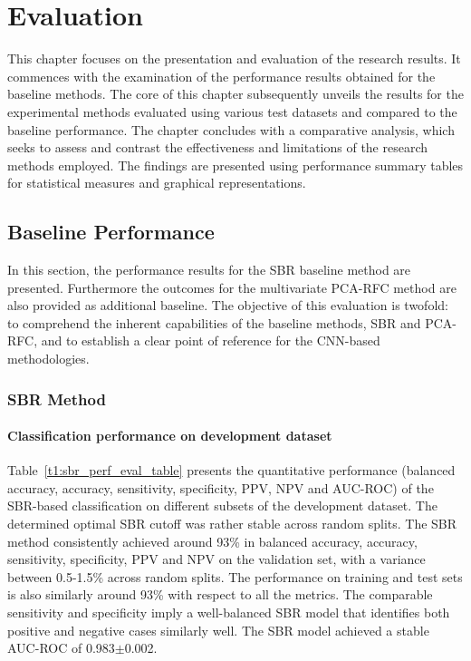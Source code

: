 \section{Evaluation}
\label{sec:evaluation}

This chapter focuses on the presentation and evaluation of the research results.
It commences with the examination of the performance results obtained for the baseline methods.
The core of this chapter subsequently unveils the results 
for the experimental methods evaluated using various test datasets and compared to the baseline performance.
The chapter concludes with a comparative analysis, which seeks to assess and contrast the effectiveness and 
limitations of the research methods employed.
The findings are presented using performance summary tables for statistical measures and graphical representations.

\subsection{Baseline Performance}
\label{subsec:baseline_performance}

In this section, the performance results for the SBR baseline method are presented. 
Furthermore the outcomes for the multivariate PCA-RFC method are also provided as additional baseline.
The objective of this evaluation is twofold: to comprehend the inherent capabilities of the baseline methods, SBR and
PCA-RFC, and to establish a clear point of reference for the CNN-based methodologies.

\subsubsection{SBR Method}
\label{subsubsec:eval_sbr}



\paragraph{Classification performance on development dataset}

Table~\ref{t1:sbr_perf_eval_table} presents the quantitative performance 
(balanced accuracy, accuracy, sensitivity, specificity, PPV, NPV and AUC-ROC) of the SBR-based classification 
on different subsets of the development dataset.
The determined optimal SBR cutoff was rather stable across random splits.
The SBR method consistently achieved around 93\% in balanced accuracy, accuracy, sensitivity, specificity, PPV and NPV 
on the validation set, with a variance between 0.5-1.5\% across random splits.
The performance on training and test sets is also similarly around 93\% with respect to all the metrics.
The comparable sensitivity and specificity imply a well-balanced SBR model that 
identifies both positive and negative cases similarly well.
The SBR model achieved a stable AUC-ROC of 0.983$\pm$0.002.


